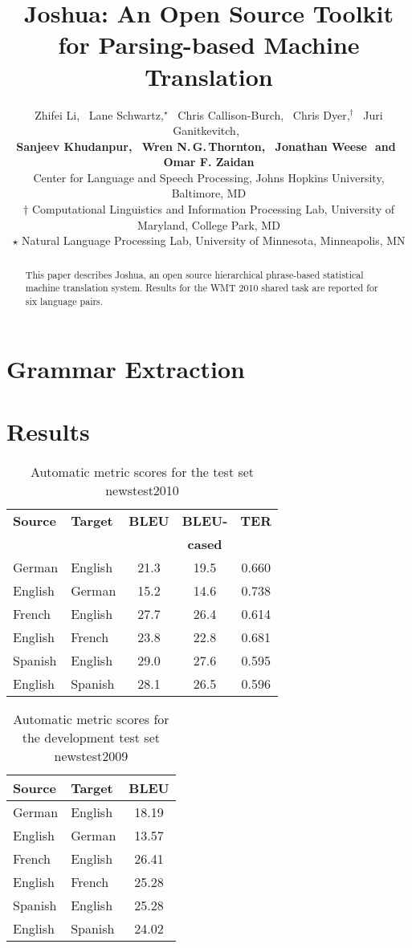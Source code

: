\documentclass[11pt]{article}
\title{Joshua: An Open Source Toolkit for Parsing-based Machine Translation}
\author{
Zhifei Li,\,\,\,
 Lane Schwartz,$^\star$\,\,\,
Chris Callison-Burch,\,\,\, %
Chris Dyer,$^\dagger$\,\,\,
Juri Ganitkevitch,\,\,\, \\
{\bf Sanjeev Khudanpur,\,\,\, 
Wren N.\,G.\,Thornton,\,\,\,
Jonathan Weese\,\,
{\textnormal{and}}\,\,\,Omar F. Zaidan}\\
Center for Language and Speech Processing, Johns Hopkins University, Baltimore, MD\\
$\dagger$ Computational Linguistics and Information Processing Lab, University of Maryland, College Park, MD\\
$\star$ Natural Language Processing Lab, University of Minnesota, Minneapolis, MN }
\date{}
\begin{document}
\maketitle

\begin{abstract}
 This paper describes Joshua, an open source hierarchical phrase-based statistical machine translation system. Results for the WMT 2010 shared task are reported for six language pairs.
\end{abstract}

\listoftodos

\section{Grammar Extraction}


\section{Results}


\begin{table}[h]
\begin{center}
\begin{tabular}{|l|l||c|c|c|}
\hline
\bf Source & \bf Target & \bf BLEU & \bf BLEU- & \bf TER \\
& & & \bf cased & \\
\hline
German & English & 21.3 & 19.5 & 0.660 \\ \hline
English & German & 15.2  & 14.6  & 0.738 \\ \hline
French & English & 27.7 & 26.4 & 0.614 \\ \hline
English & French & 23.8 & 22.8 & 0.681 \\ \hline
Spanish & English & 29.0 & 27.6 & 0.595 \\ \hline
English & Spanish & 28.1 & 26.5 & 0.596  \\ \hline
\end{tabular}
\end{center}
\caption{\label{scores} Automatic metric scores for the test set newstest2010 }
\end{table}


\begin{table}[h]
\begin{center}
\begin{tabular}{|l|l||c|}
\hline
\bf Source & \bf Target & \bf BLEU  \\
\hline
German & English & 18.19  \\ \hline
English & German & 13.57 \\ \hline
French & English & 26.41 \\ \hline
English & French & 25.28 \\ \hline
Spanish & English & 25.28 \\ \hline
English & Spanish & 24.02  \\ \hline
\end{tabular}
\end{center}
\caption{\label{devtest-scores} Automatic metric scores for the development test set newstest2009}
\end{table}
\end{document}
